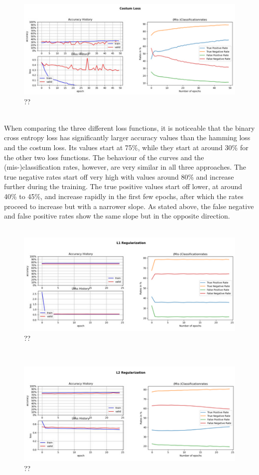 \\
\begin{figure}[h]
	\centering
	\includegraphics[scale=0.8]{Figures/chapter04/multi_costum}
	\decoRule
	\caption[??]{??}
	\label{fig:MultilabelCostumLoss}
\end{figure}
\\
When comparing the three different loss functions, it is noticeable that the binary cross entropy loss has significantly larger accuracy values than the hamming loss and the costum loss. Its values start at 75\%, while they start at around 30\% for the other two loss functions. The behaviour of the curves and the (mis-)classification rates, however, are very similar in all three approaches. The true negative rates start off very high with values around 80\% and increase further during the training. The true positive values start off lower, at around 40\% to 45\%, and increase rapidly in the first few epochs, after which the rates proceed to increase but with a narrower slope. As stated above, the false negative and false positive rates show the same slope but in the opposite direction.
\\
\\
\begin{figure}[h]
	\centering
	\includegraphics[scale=0.8]{Figures/chapter04/multi_reg1}
	\decoRule
	\caption[??]{??}
	\label{fig:MultilabelL1Regularization}
\end{figure}
\\
\begin{figure}[h]
	\centering
	\includegraphics[scale=0.8]{Figures/chapter04/multi_reg2}
	\decoRule
	\caption[??]{??}
	\label{fig:MultilabelL2Regularization}
\end{figure}
